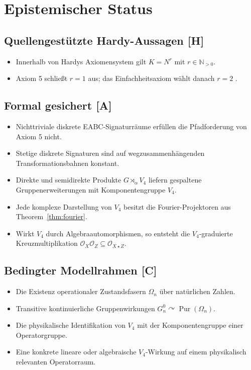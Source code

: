 \documentclass[11pt,a4paper,reqno]{amsart}
\theoremstyle{definition}
\theoremstyle{remark}
\newcommand{\N}{\mathbb{N}}
\newcommand{\Pur}{\operatorname{Pur}}
\newcommand{\Oh}{\mathcal{O}}
\newcommand{\StatusH}{\textnormal{\textbf{[H]}}}
\newcommand{\StatusA}{\textnormal{\textbf{[A]}}}
\newcommand{\StatusC}{\textnormal{\textbf{[C]}}}
\begin{document}
\section{Epistemischer Status}

\subsection*{Quellengestützte Hardy-Aussagen \StatusH}
\begin{itemize}[leftmargin=2.2em]
  \item Innerhalb von Hardys Axiomensystem gilt $K=N^r$ mit $r\in\N_{>0}$.
  \item Axiom 5 schließt $r=1$ aus; das Einfachheitsaxiom wählt danach $r=2$ \cite{Hardy2001}.
\end{itemize}

\subsection*{Formal gesichert \StatusA}
\begin{itemize}[leftmargin=2.2em]
  \item Nichttriviale diskrete EABC-Signaturräume erfüllen die Pfadforderung von Axiom 5 nicht.
  \item Stetige diskrete Signaturen sind auf wegzusammenhängenden Transformationsbahnen konstant.
  \item Direkte und semidirekte Produkte $G\rtimes_\alpha V_4$ liefern gespaltene Gruppenerweiterungen mit Komponentengruppe $V_4$.
  \item Jede komplexe Darstellung von $V_4$ besitzt die Fourier-Projektoren aus Theorem~\ref{thm:fourier}.
  \item Wirkt $V_4$ durch Algebraautomorphismen, so entsteht die $V_4$-graduierte Kreuzmultiplikation $\Oh_X\Oh_Z\subseteq\Oh_{X\star Z}$.
\end{itemize}

\subsection*{Bedingter Modellrahmen \StatusC}
\begin{itemize}[leftmargin=2.2em]
  \item Die Existenz operationaler Zustandsfasern $\Omega_n$ über natürlichen Zahlen.
  \item Transitive kontinuierliche Gruppenwirkungen $G_n^0\curvearrowright\Pur(\Omega_n)$.
  \item Die physikalische Identifikation von $V_4$ mit der Komponentengruppe einer Operatorgruppe.
  \item Eine konkrete lineare oder algebraische $V_4$-Wirkung auf einem physikalisch relevanten Operatorraum.
\end{itemize}
\end{document}
